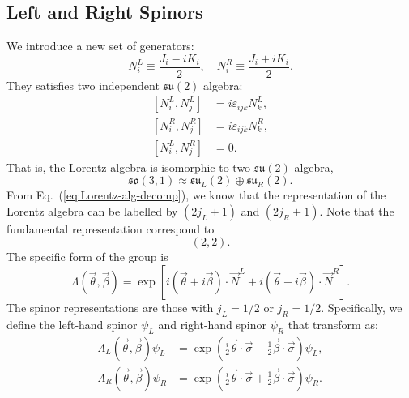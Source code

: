 \subsection{Left and Right Spinors}
We introduce a new set of generators:
\begin{equation}
	N_i^{L} \equiv \frac{J_i - i K_i}{2}, \quad
	N_i^{R} \equiv \frac{J_i + i K_i}{2}.
\end{equation}
They satisfies two independent $\mathfrak{su}(2)$ algebra:
\begin{equation}
\begin{aligned}
	\left[N_i^L, N_j^L \right] &= i\varepsilon_{ijk}N_k^L, \\
	\left[N_i^R, N_j^R \right] &= i\varepsilon_{ijk}N_k^R, \\
	\left[N_i^L, N_j^R \right] &= 0.
\end{aligned}
\end{equation}
That is, the Lorentz algebra is isomorphic to two $\mathfrak{su}(2)$ algebra,
\begin{equation}
	\mathfrak{so}(3,1) \approx \mathfrak{su}_L(2)\oplus\mathfrak{su}_R(2).
	\label{eq:Lorentz-alg-decomp}
\end{equation}
From Eq.~(\ref{eq:Lorentz-alg-decomp}), we know that the representation of the Lorentz algebra can be labelled by $(2 j_L+1)$ and $(2 j_R+1)$.
Note that the fundamental representation correspond to
\begin{equation*}
	\left( 2, 2 \right).
\end{equation*}
The specific form of the group is
\begin{equation}
	\Lambda(\vec\theta,\vec\beta)
	=\exp\left[i(\vec\theta+i\vec\beta)\cdot \vec N^L + i(\vec\theta-i\vec\beta)\cdot \vec N^R\right].
\end{equation}
The spinor representations are those with $j_L=1/2$ or $j_R=1/2$. 
Specifically, we define the left-hand spinor $\psi_L$ and right-hand spinor $\psi_R$ that transform as:
\begin{equation}\label{eq:qft-left-right-spinor-rep}
\begin{aligned}
	\Lambda_L(\vec\theta,\vec\beta)\psi_L 
	&= \exp\left(\frac{i}{2}\vec\theta\cdot\vec\sigma-\frac{1}{2}\vec\beta\cdot\vec\sigma \right) \psi_L, \\
	\Lambda_R(\vec\theta,\vec\beta)\psi_R 
	&= \exp\left(\frac{i}{2}\vec\theta\cdot\vec\sigma+\frac{1}{2}\vec\beta\cdot\vec\sigma \right) \psi_R.
\end{aligned}
\end{equation}
